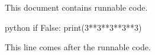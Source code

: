 \documentclass{article}
\begin{document}
This document contains runnable code.

\begin{runnableCode}{python}
if False:
    print(3**3**3**3**3)
\end{runnableCode}

This line comes after the runnable code.
\end{document}
